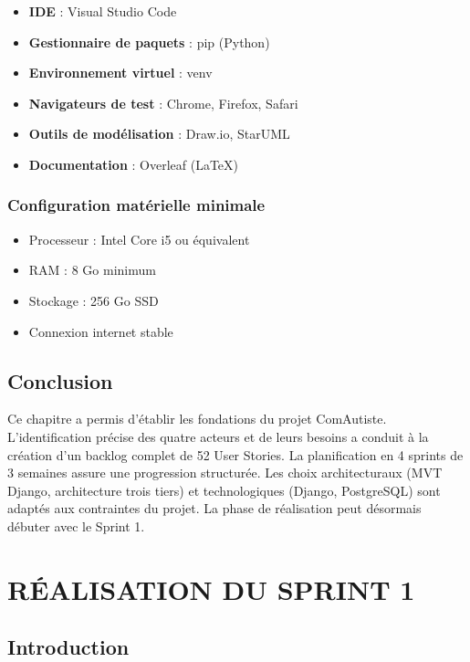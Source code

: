 \documentclass[12pt,a4paper]{report}
\begin{document}
\begin{itemize}
    \item \textbf{IDE} : Visual Studio Code 
    \item \textbf{Gestionnaire de paquets} : pip (Python)
    \item \textbf{Environnement virtuel} : venv
    \item \textbf{Navigateurs de test} : Chrome, Firefox, Safari
    \item \textbf{Outils de modélisation} : Draw.io, StarUML
    \item \textbf{Documentation} : Overleaf (LaTeX)
\end{itemize}

\subsection{Configuration matérielle minimale}

\begin{itemize}
    \item Processeur : Intel Core i5 ou équivalent
    \item RAM : 8 Go minimum
    \item Stockage : 256 Go SSD
    \item Connexion internet stable
\end{itemize}

\section{Conclusion}

Ce chapitre a permis d'établir les fondations du projet ComAutiste. L'identification précise des quatre acteurs et de leurs besoins a conduit à la création d'un backlog complet de 52 User Stories. La planification en 4 sprints de 3 semaines assure une progression structurée. Les choix architecturaux (MVT Django, architecture trois tiers) et technologiques (Django, PostgreSQL) sont adaptés aux contraintes du projet. La phase de réalisation peut désormais débuter avec le Sprint 1.

\newpage

\chapter{RÉALISATION DU SPRINT 1}

\section{Introduction}
\end{document}
